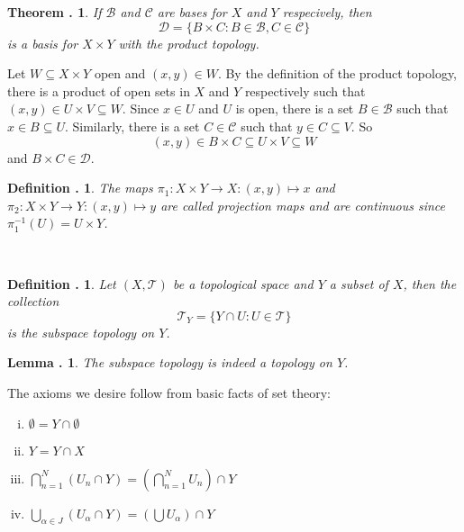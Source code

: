 \documentclass[twoside]{report}
\newcommand{\br}{\centering{ * \quad * \quad *} \\  }
\newcounter{Lecture}
\theoremstyle{myts}
\newcounter{c}[Lecture]
\newtheorem{dfn}[c]{Definition \arabic{Lecture}.}
\newtheorem{thm}[c]{Theorem \arabic{Lecture}.}
\newtheorem{lma}[c]{Lemma \arabic{Lecture}.}
\newenvironment{prf}{
  \noindent\begin{mdframed}[style=prf]}{\end{mdframed} \vspace{1em}
}
\begin{document}
\begin{thm}
  If $\mathcal{B}$ and $\mathcal{C}$ are bases for $X$ and $Y$ respecively, then
  \[
    \mathcal{D} = \{ B\times C : B\in\mathcal{B}, C\in\mathcal{C} \}
  \]
  is a basis for $X\times Y$ with the product topology.
\end{thm}

\begin{prf}
  Let \( W\subseteq X\times Y\) open and \( (x,y) \in W \). By the definition of the product topology, there is a product of open sets in $X$ and $Y$ respectively such that \( (x,y) \in U\times V \subseteq W \). Since \(x\in U\) and $U$ is open, there is a set \(B\in\mathcal{B}\) such that \( x \in B\subseteq U\). Similarly, there is a set \(C\in\mathcal{C}\) such that \(y\in C\subseteq V\). So
  \[
    (x,y) \in B\times C \subseteq U\times V \subseteq W
  \]
  and \(B\times C\in \mathcal{D}\).
\end{prf}

\begin{dfn}
  The maps \( \pi_1 : X\times Y \to X : (x,y) \mapsto x \) and \( \pi_2: X\times Y \to Y : (x,y) \mapsto y \) are called \emph{projection maps} and are continuous since \( \pi_1^{-1} (U) = U \times Y \).
\end{dfn}

\br

\begin{dfn}
  Let \( (X, \mathcal{T} ) \) be a topological space and $Y$ a subset of $X$, then the collection
  \[
    \mathcal{T}_Y = \{ Y\cap U : U\in\mathcal{T} \}
  \]
  is the \emph{subspace topology} on $Y$.
\end{dfn}

\begin{lma}
  The subspace topology is indeed a topology on $Y$.
\end{lma}

\begin{prf}
  The axioms we desire follow from basic facts of set theory:
  \begin{enumerate}[(i)]
    \item \( \emptyset = Y \cap \emptyset \)
    \item \( Y = Y\cap X \)
    \item \( \bigcap_{n=1}^N (U_n \cap Y) = \left(\bigcap_{n=1}^N U_n \right) \cap Y \)
    \item \( \bigcup_{\alpha\in J} ( U_\alpha \cap Y ) = \left( \bigcup U_\alpha \right) \cap Y \)
  \end{enumerate}
\end{prf}
\end{document}
